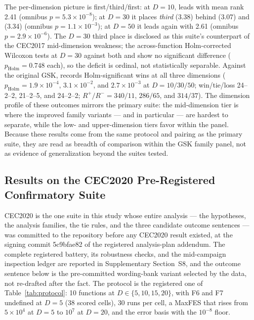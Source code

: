The per-dimension picture is first/third/first: at $D = 10$,
\dtgsk{} leads with mean rank 2.41 (omnibus
$p = 5.3 \times 10^{-8}$); at $D = 30$ it places \emph{third} (3.38)
behind \egsk{} (3.07) and \atmals{} (3.34) (omnibus
$p = 1.1 \times 10^{-3}$); at $D = 50$ it leads again with 2.61
(omnibus $p = 2.9 \times 10^{-6}$).
The $D = 30$ third place is disclosed as this suite's counterpart of
the CEC2017 mid-dimension weakness; the across-function
Holm-corrected Wilcoxon tests at $D = 30$ against both \egsk{} and
\atmals{} show no significant difference ($p_{\mathrm{Holm}} = 0.748$
each), so the deficit is ordinal, not statistically separable.
Against the original GSK, \dtgsk{} records Holm-significant wins at
all three dimensions
($p_{\mathrm{Holm}} = 1.9 \times 10^{-4}$, $3.1 \times 10^{-2}$, and
$2.7 \times 10^{-3}$ at $D = 10/30/50$; win/tie/loss 24--2--2,
21--2--5, and 24--2--2; $R^{+}/R^{-} = 340/11$, $286/65$, and
$314/37$).
The dimension profile of these outcomes mirrors the primary suite:
the mid-dimension tier is where the improved family variants ---
\egsk{} and \atmals{} in particular --- are hardest to separate,
while the low- and upper-dimension tiers favor \dtgsk{} within the
panel.
Because these results come from the same protocol and pairing as the
primary suite, they are read as breadth of comparison within the GSK
family panel, not as evidence of generalization beyond the suites
tested.

\subsection{Results on the CEC2020 Pre-Registered Confirmatory Suite}\label{sec:exp:cec2020}

CEC2020 is the one suite in this study whose entire analysis --- the
hypotheses, the analysis families, the tie rules, and the three candidate
outcome sentences --- was committed to the repository before any CEC2020
result existed, at the signing commit 5c9bfae82 of the registered
analysis-plan addendum. The complete registered battery, its robustness
checks, and the mid-campaign inspection ledger are reported in
Supplementary Section~S8, and the outcome sentence below is the
pre-committed wording-bank variant selected by the data, not re-drafted
after the fact.
The protocol is the registered one of Table~\ref{tab:protocol}: 10
functions at $D \in \{5, 10, 15, 20\}$, with F6 and F7 undefined at
$D = 5$ (38 scored cells), 30 runs per cell, a MaxFES that rises from
$5 \times 10^{4}$ at $D = 5$ to $10^{7}$ at $D = 20$, and the error
basis with the $10^{-8}$ floor.

